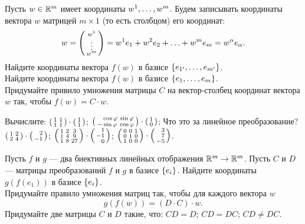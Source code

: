 \documentclass[a4paper,12pt]{article}
\newcommand{\smat}[1]{\hr{\begin{smallmatrix}#1\end{smallmatrix}}}
\begin{document}
    Пусть $w\in\mathbb{R}^m$ имеет координаты $w^1,\ldots, w^m$.
    Будем записывать координаты вектора $w$ матрицей $m\times 1$ (то есть столбцом) его координат:
\vspace*{-4mm}
    $$ w = \left(\begin{smallmatrix}w^1\\\vdots\\w^m\end{smallmatrix}\right) = w^1 e_1 + w^2 e_2 + \ldots +  w^m e_m = w^\alpha e_\alpha.$$
    Найдите координаты вектора $f(w)$ в базисе $\left\{e_{1'},\ldots, e_{m'}\right\}$.\\
    Найдите координаты вектора $f(w)$ в базисе $\left\{e_{1},\ldots, e_{m}\right\}$.\\
    Придумайте привило умножения матрицы $C$ на вектор-столбец координат вектора $w$ так, чтобы $f(w) = C\cdot w$.


    Вычислите:
    $\smat{1&1\\1&1}\cdot\smat{1\\1}$;
    $\smat{\phm\cos\ph&\sin\ph\\-\sin\ph&\cos\ph}\cdot\smat{1\\0}$;
    Что это за линейное преобразование?\\
    $\smat{1&2\\2&4}\cdot\smat{\phm2\\-1}$;
    $\smat{1&2&3\\1&4&9\\1&8&27}\cdot\smat{\phm1\\-1\\\phm0}$;
    $\smat{0&0&1\\0&1&0\\1&0&0}\cdot\smat{\phm3\\\phm7\\-5}$.



    Пусть $f$ и $g$ --- два биективных линейных отображения $\mathbb{R}^m\rightarrow\mathbb{R}^m$.
    Пусть $C$ и $D$  --- матрицы преобразований $f$ и $g$ в базисе $\left\{e_i\right\}$.
    Найдите координаты $g(f(e_1))$ в базисе $\left\{e_i\right\}$.\\
    Придумайте правило умножения матриц так, чтобы для каждого вектора $w$
\vspace*{-4mm}
    $$g(f(w)) = (D\cdot C) \cdot w.$$
\vspace{-8mm}
    Придумайте две матрицы $C$ и $D$ такие, что:
    $C D = D$;
    $C D = D C$;
    $C D \ne D C$.
\end{document}
